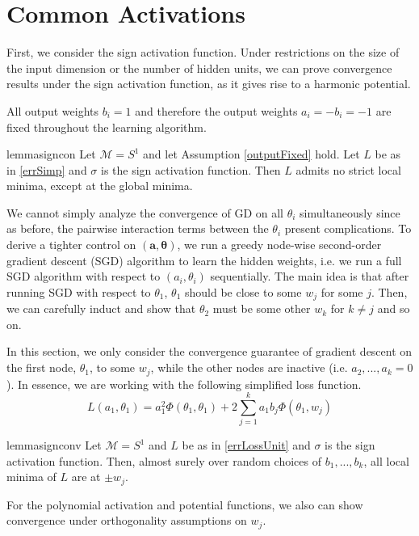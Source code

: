 \section{Common Activations}
First, we consider the sign activation function. Under restrictions on the size of the input dimension or the number of hidden units, we can prove convergence results under the sign activation function, as it gives rise to a harmonic potential.

\begin{assumption}
\label{outputFixed}
All output weights $b_i = 1$ and therefore the output weights  $a_i = - b_i = -1$ are fixed throughout the learning algorithm. 
\end{assumption}

\begin{restatable}{lemma}{signcon}\label{signCon}
Let $\mathcal{M} = S^1$ and let Assumption \ref{outputFixed} hold. Let $L$ be as in \eqref{errSimp} and $\sigma$ is the sign activation function. Then $L$ admits no strict local minima, except at the global minima.
\end{restatable}


We cannot simply analyze the convergence of GD
on all $\theta_i$ simultaneously since as before, the pairwise
interaction terms between the $\theta_i$ present complications. To
derive a tighter control on $(\boldsymbol{a,\theta})$, we run a greedy
node-wise second-order gradient descent (SGD) algorithm to learn the hidden weights, i.e. we run a full SGD algorithm with respect to $(a_i,\theta_i)$ sequentially. The
main idea is that after running SGD with respect to $\theta_1$,
$\theta_1$ should be close to some $w_j$ for some $j$. Then, we can
carefully induct and show that $\theta_2$ must be some other $w_k$ for
$k\neq j$ and so on. 

In this section, we only consider the convergence guarantee of gradient descent on the first node, $\theta_1$, to some $w_j$, while the other nodes are inactive (i.e. $a_2,...,a_k = 0$). In essence, we are working with the following simplified loss function.
%
\begin{equation}\label{errLossUnit}
L(a_1,\theta_1) =  a_1^2 \Phi(\theta_1,\theta_1)  + 2\sum_{j=1}^k a_1b_j \Phi(\theta_1,w_j)
\end{equation}


\begin{restatable}{lemma}{signconv}
\label{SignConv}
Let $\mathcal{M} = S^1$ and $L$ be as in \eqref{errLossUnit} and $\sigma$ is the sign activation function. Then, almost surely over random choices of $b_1,...,b_k$, all local minima of $L$ are at $\pm w_j$. 
\end{restatable}
%
For the polynomial activation and potential functions, we also can show convergence under orthogonality assumptions on $w_j$. 

